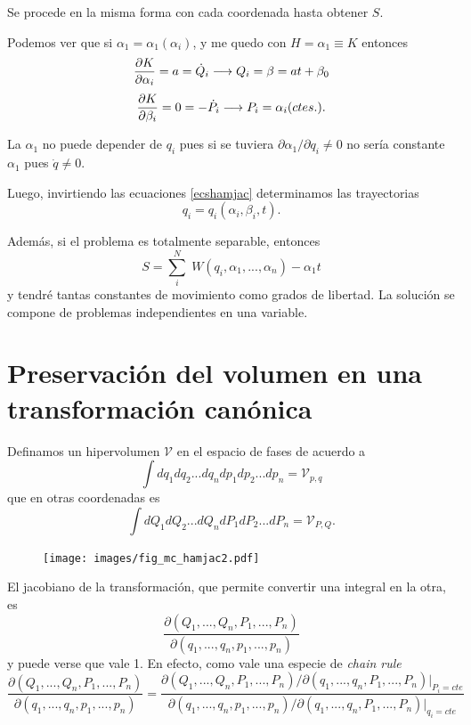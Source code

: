 \documentclass[10pt,oneside]{CBFT_book}
\begin{document}
Se procede en la misma forma con cada coordenada hasta obtener $S$.

Podemos ver que si $\alpha_1 = \alpha_1(\alpha_i)$, y me quedo con $H=\alpha_1 \equiv K$ entonces
\[
	\frac{\partial^{\hspace{-0.05em}} {K}}{\partial {\alpha_i}^{\hspace{-0.05em}}} = a = \dot{Q}_i \longrightarrow Q_i = \beta = a t + \beta_0 
\]
\[
	\frac{\partial^{\hspace{-0.05em}} {K}}{\partial {\beta_i}^{\hspace{-0.05em}}} = 0 = -\dot{P}_i \longrightarrow P_i = \alpha_i (ctes.).
\]

La $\alpha_1$ no puede depender de $q_i$ pues si se tuviera $\partial \alpha_1 /\partial q_i \neq 0$ 
no sería constante $\alpha_1$ pues $\dot{q}\neq 0$.

Luego, invirtiendo las ecuaciones \eqref{ecshamjac} determinamos las trayectorias
\[
	q_i = q_i(\alpha_i, \beta_i, t).
\]

Además, si el problema es totalmente separable, entonces
\[
	S = \sum_i^N \; W(q_i, \alpha_1,...,\alpha_n) - \alpha_1 t
\]
y tendré tantas constantes de movimiento como grados de libertad. La solución se compone de problemas
independientes en una variable.

\section{Preservación del volumen en una transformación canónica}

Definamos un hipervolumen $\mathcal{V}$ en el espacio de fases de acuerdo a
\[
	\int dq_1 dq_2 ... dq_n dp_1 dp_2 ... dp_n = \mathcal{V}_{p,q}
\]
que en otras coordenadas es
\[
	\int dQ_1 dQ_2 ... dQ_n dP_1 dP_2 ... dP_n = \mathcal{V}_{P,Q}.
\]

\begin{figure}
	\begin{center}
	\texttt{[image: images/fig\_mc\_hamjac2.pdf]}	 
	\end{center}
	\caption{}
\end{figure} 

El jacobiano de la transformación, que permite convertir una integral en la otra, es 
\[
	\frac{\partial (Q_1,...,Q_n,P_1,...,P_n)}{\partial (q_1,...,q_n,p_1,...,p_n)} 
\]
y puede verse que vale 1. En efecto, como vale una especie de {\it chain rule}
\[
	\frac{\partial (Q_1,...,Q_n,P_1,...,P_n)}{\partial (q_1,...,q_n,p_1,...,p_n)}  =
	\frac{\partial (Q_1,...,Q_n,P_1,...,P_n)/\partial (q_1,...,q_n,P_1,...,P_n)|_{P_i=cte}}
	{\partial (q_1,...,q_n,p_1,...,p_n)/\partial (q_1,...,q_n,P_1,...,P_n)|_{q_i=cte}}
\]
\end{document}
